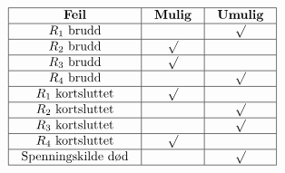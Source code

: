 $$\vbox{\offinterlineskip
\halign{\strut
\vrule \quad\hfil # \ \hfil & 
\vrule \quad\hfil # \ \hfil & 
\vrule \quad\hfil # \ \hfil \vrule \cr
\noalign{\hrule}
%
{\bf Feil} & {\bf Mulig} & {\bf Umulig} \cr
%
\noalign{\hrule}
%
$R_1$ brudd &  & $\surd$ \cr
%
\noalign{\hrule}
%
$R_2$ brudd & $\surd$ &  \cr
%
\noalign{\hrule}
%
$R_3$ brudd & $\surd$ &  \cr
%
\noalign{\hrule}
%
$R_4$ brudd &  & $\surd$ \cr
%
\noalign{\hrule}
%
$R_1$ kortsluttet & $\surd$ &  \cr
%
\noalign{\hrule}
%
$R_2$ kortsluttet &  & $\surd$ \cr
%
\noalign{\hrule}
%
$R_3$ kortsluttet &  & $\surd$ \cr
%
\noalign{\hrule}
%
$R_4$ kortsluttet & $\surd$ &  \cr
%
\noalign{\hrule}
%
Spenningskilde død &  & $\surd$ \cr
%
\noalign{\hrule}
} %
}$$ %










